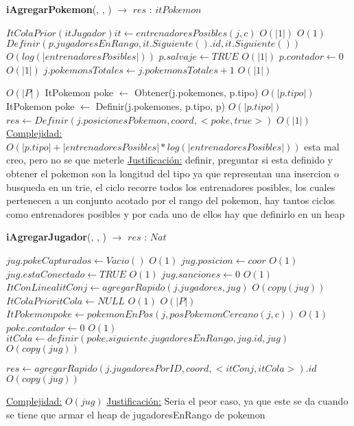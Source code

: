 \begin{algorithm}[H]{\textbf{iAgregarPokemon}(, , ) $\to$ $res$ : $itPokemon$}
	\begin{algorithmic}
	
	\State $ItColaPrior(itJugador) it \gets entrenadoresPosibles(j,c) $ \Comment $O(|1|)$
	 \Comment $O(1)$
		\State $Definir(p.jugadoresEnRango, it.Siguiente().id, it.Siguiente()) $ \Comment $O(log(|entrenadoresPosibles|))$
	\EndWhile
	\State $p.salvaje \gets TRUE $ \Comment $O(|1|)$
	\State $p.contador \gets 0 $ \Comment $O(|1|)$
	\State $j.pokemonsTotales \gets j.pokemonsTotales+1 $ \Comment $O(|1|)$
	
	 \Comment $O(|P|)$
		\State ItPokemon poke $\gets$ Obtener(j.pokemones, p.tipo)  \Comment $O(|p.tipo|)$
	\Else
		\State ItPokemon poke $\gets$ Definir(j.pokemones, p.tipo, p) \Comment $O(|p.tipo|)$
	\EndIf
	\State $res \gets Definir(j.posicionesPokemon, coord, <poke,true>) $ \Comment $O(|1|)$
		\medskip
		\Statex \underline{Complejidad:} $O(|p.tipo| + |entrenadoresPosibles| * log(|entrenadoresPosibles|))$
		 esta mal creo, pero no se que meterle
		\Statex \underline{Justificación:}  definir, preguntar si esta definido 
		y obtener el pokemon son la longitud del tipo ya que representan una insercion 
		o busqueda en un trie, el ciclo recorre todos los entrenadores posibles, 
		los cuales pertenecen a un conjunto acotado por el rango del pokemon, 
		hay tantos ciclos como entrenadores posibles y por cada uno de ellos 
		hay que definirlo en un heap 
    \end{algorithmic}
\end{algorithm}

\begin{algorithm}[H]{\textbf{iAgregarJugador}(, , ) $\to$ $res$ : $Nat$}
	\begin{algorithmic}
	\State $jug.pokeCapturados \gets Vacio() $ \Comment $O(1)$
	\State $jug.posicion \gets coor $ \Comment $O(1)$
	\State $jug.estaConectado \gets TRUE $ \Comment $O(1)$
	\State $jug.sanciones \gets 0 $ \Comment $O(1)$
	\State $ItConLineal itConj \gets agregarRapido(j.jugadores,jug) $ \Comment $O(copy(jug))$
	\State $ItColaPrior itCola \gets NULL $ \Comment $O(1)$
	 \Comment $O(|P|)$
		\State $ItPokemon poke \gets pokemonEnPos(j,posPokemonCercano(j,c))$ \Comment $O(1)$
		\State $poke.contador \gets 0$ \Comment $O(1)$
		\State $ itCola \gets definir(poke.siguiente.jugadoresEnRango,jug.id,jug) $ \Comment $O(copy(jug))$
	\EndIf
	
	\State $res \gets agregarRapido(j.jugadoresPorID, coord, <itConj,itCola>).id $ \Comment $O(copy(jug))$

	
	
		\medskip
		\Statex \underline{Complejidad:} $O(jug)$
		\Statex \underline{Justificación:} Seria el peor caso, ya que este se da cuando se tiene que armar el heap de jugadoresEnRango de pokemon
    \end{algorithmic}
\end{algorithm}

